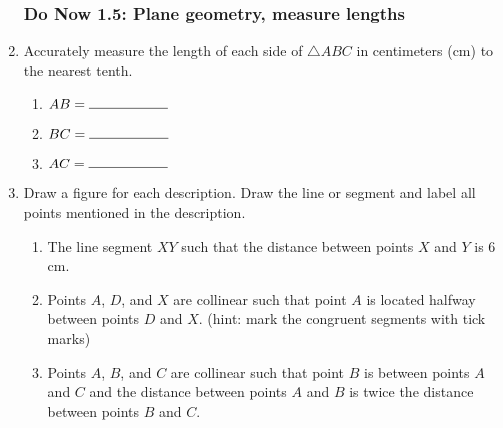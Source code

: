 \documentclass[12pt, twoside]{article}
\begin{document}
\begin{enumerate}
\newpage
\subsubsection*{Do Now 1.5: Plane geometry, measure lengths}
\item Accurately measure the length of each side of $\triangle ABC$ in centimeters (cm) to the nearest tenth.
    \bigskip
  \begin{enumerate}
    \item $AB=\rule{2cm}{0.15mm}$ \bigskip
    \item $BC=\rule{2cm}{0.15mm}$ \bigskip
    \item $AC=\rule{2cm}{0.15mm}$
  \end{enumerate}
  \begin{center}
  \end{center}

\item Draw a figure for each description. Draw the line or segment and label all points mentioned in the description.
  \begin{enumerate}
    \item The line segment $XY$ such that the distance between points $X$ and $Y$ is 6 cm. \vspace{2cm}
    \item Points $A$, $D$, and $X$ are collinear such that point $A$ is located halfway between points $D$ and $X$. (hint: mark the congruent segments with tick marks) \vspace{2cm}
    \item Points $A$, $B$, and $C$ are collinear such that point $B$ is between points $A$ and $C$ and the distance between points $A$ and $B$ is twice the distance between points $B$ and $C$. \vspace{2cm}
  \end{enumerate}

\newpage

\end{enumerate}
\end{document}
